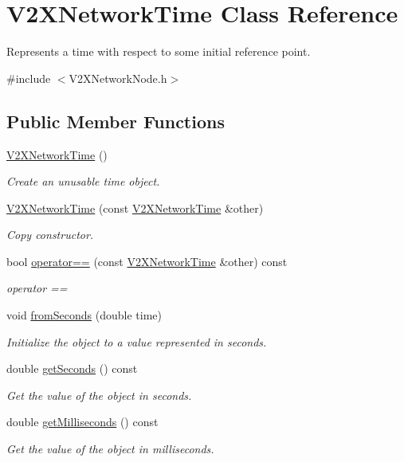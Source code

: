 \hypertarget{classV2XNetworkTime}{}\section{V2\+X\+Network\+Time Class Reference}
\label{classV2XNetworkTime}


Represents a time with respect to some initial reference point.  




{\ttfamily \#include $<$V2\+X\+Network\+Node.\+h$>$}

\subsection*{Public Member Functions}
\begin{DoxyCompactItemize}
\item 
\hyperlink{classV2XNetworkTime_a75e1b146cc3c8cb39c88948c97380f77}{V2\+X\+Network\+Time} ()
\begin{DoxyCompactList}\small\item\em Create an unusable time object. \end{DoxyCompactList}\item 
\hyperlink{classV2XNetworkTime_af11e2cc92b8015ecedbf5a897f71ee13}{V2\+X\+Network\+Time} (const \hyperlink{classV2XNetworkTime}{V2\+X\+Network\+Time} \&other)
\begin{DoxyCompactList}\small\item\em Copy constructor. \end{DoxyCompactList}\item 
bool \hyperlink{classV2XNetworkTime_a53e082e3029c6cd1a6a1395ea4fa12d7}{operator==} (const \hyperlink{classV2XNetworkTime}{V2\+X\+Network\+Time} \&other) const 
\begin{DoxyCompactList}\small\item\em operator == \end{DoxyCompactList}\item 
void \hyperlink{classV2XNetworkTime_a545eaae8a37028c0137f09f330d3fa5c}{from\+Seconds} (double time)
\begin{DoxyCompactList}\small\item\em Initialize the object to a value represented in seconds. \end{DoxyCompactList}\item 
double \hyperlink{classV2XNetworkTime_a081cf6f13258bdf2860359e4b2f0d9a5}{get\+Seconds} () const 
\begin{DoxyCompactList}\small\item\em Get the value of the object in seconds. \end{DoxyCompactList}\item 
double \hyperlink{classV2XNetworkTime_af3b23cc9ec13d229d6cfd2397b270dae}{get\+Milliseconds} () const 
\begin{DoxyCompactList}\small\item\em Get the value of the object in milliseconds. \end{DoxyCompactList}\end{DoxyCompactItemize}


